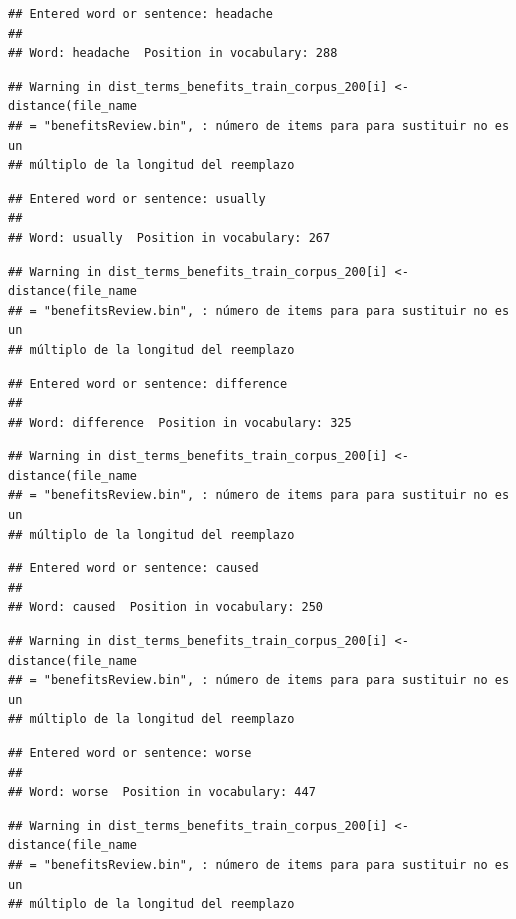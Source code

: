 \documentclass[spanish,]{article}
\begin{document}
\begin{verbatim}
## Entered word or sentence: headache
## 
## Word: headache  Position in vocabulary: 288
\end{verbatim}

\begin{verbatim}
## Warning in dist_terms_benefits_train_corpus_200[i] <- distance(file_name
## = "benefitsReview.bin", : número de items para para sustituir no es un
## múltiplo de la longitud del reemplazo
\end{verbatim}

\begin{verbatim}
## Entered word or sentence: usually
## 
## Word: usually  Position in vocabulary: 267
\end{verbatim}

\begin{verbatim}
## Warning in dist_terms_benefits_train_corpus_200[i] <- distance(file_name
## = "benefitsReview.bin", : número de items para para sustituir no es un
## múltiplo de la longitud del reemplazo
\end{verbatim}

\begin{verbatim}
## Entered word or sentence: difference
## 
## Word: difference  Position in vocabulary: 325
\end{verbatim}

\begin{verbatim}
## Warning in dist_terms_benefits_train_corpus_200[i] <- distance(file_name
## = "benefitsReview.bin", : número de items para para sustituir no es un
## múltiplo de la longitud del reemplazo
\end{verbatim}

\begin{verbatim}
## Entered word or sentence: caused
## 
## Word: caused  Position in vocabulary: 250
\end{verbatim}

\begin{verbatim}
## Warning in dist_terms_benefits_train_corpus_200[i] <- distance(file_name
## = "benefitsReview.bin", : número de items para para sustituir no es un
## múltiplo de la longitud del reemplazo
\end{verbatim}

\begin{verbatim}
## Entered word or sentence: worse
## 
## Word: worse  Position in vocabulary: 447
\end{verbatim}

\begin{verbatim}
## Warning in dist_terms_benefits_train_corpus_200[i] <- distance(file_name
## = "benefitsReview.bin", : número de items para para sustituir no es un
## múltiplo de la longitud del reemplazo
\end{verbatim}
\end{document}
